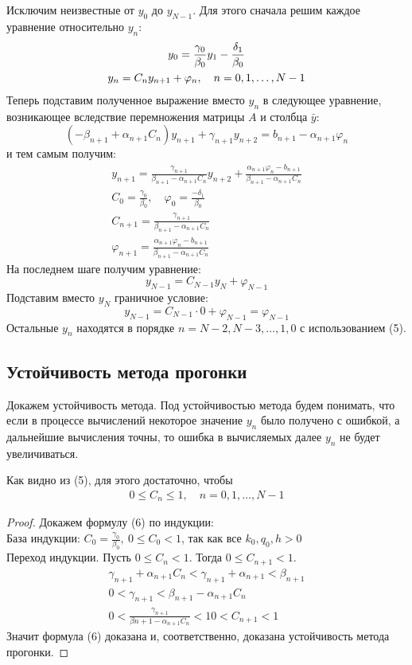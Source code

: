 \documentclass[titlepage]{article}
\def\le{\leqslant}
\begin{document}
Исключим неизвестные от $y_0$ до $y_{N-1}$. Для этого сначала решим каждое уравнение относительно $y_n$:
\begin{gather}
	\notag y_0 = \frac{\gamma_0}{\beta_0}y_1 - \frac{\delta_1}{\beta_0} \\
		   y_n = C_n y_{n+1} + \varphi_n, \quad n = 0,1,\dots,N-1
\end{gather}
Теперь подставим полученное выражение вместо $y_n$ в следующее уравнение, возникающее вследствие перемножения матрицы $A$ и столбца $\bar y$:
$$(-\beta_{n+1} + \alpha_{n+1}C_n)y_{n+1} + \gamma_{n+1}y_{n+2} = b_{n+1} - \alpha_{n+1}\varphi_n$$
и тем самым получим:
\begin{gather*}
	y_{n+1} = \frac{\gamma_{n+1}}{\beta_{n+1} - \alpha_{n+1}C_n}y_{n+2} + \frac{\alpha_{n+1}\varphi_n - b_{n+1}}{\beta_{n+1} - \alpha_{n+1}C_n} \\
	C_0 = \frac{\gamma_0}{\beta_0}, \quad \varphi_0 = \frac{-\delta_1}{\beta_0} \\
	C_{n+1} = \frac{\gamma_{n+1}}{\beta_{n+1}-\alpha_{n+1}C_n} \\
	\varphi_{n+1} = \frac{\alpha_{n+1}\varphi_n - b_{n+1}}{\beta_{n+1} - \alpha_{n+1}C_n}
\end{gather*}
На последнем шаге получим уравнение:
$$y_{N-1} = C_{N-1}y_N + \varphi_{N-1}$$
Подставим вместо $y_N$ граничное условие:
$$y_{N-1} = C_{N-1}\cdot0 + \varphi_{N-1} = \varphi_{N-1}$$
Остальные $y_n$ находятся в порядке $n = N-2, N-3, \dots, 1, 0$ с использованием (5).

\subsection{Устойчивость метода прогонки}
Докажем устойчивость метода. Под устойчивостью метода будем понимать, что если в процессе вычислений некоторое значение $y_n$ было получено с ошибкой, а дальнейшие вычисления точны, то ошибка в вычисляемых далее $y_n$ не будет увеличиваться.

Как видно из (5), для этого достаточно, чтобы
\begin{gather}
	0 \le C_n \le 1, \quad n = 0,1,\dots,N-1
\end{gather}

\begin{proof}
Докажем формулу (6) по индукции:\\
База индукции: $C_0 = \frac{\gamma_0}{\beta_0}, \ 0 \le C_0 < 1$, так как все $k_0, q_0, h > 0$ \\
Переход индукции. Пусть $0 \le C_n < 1$. Тогда $0 \le C_{n+1} < 1$.
\begin{gather*}
	\gamma_{n+1} + \alpha_{n+1}C_n < \gamma_{n+1} + \alpha_{n+1} < \beta_{n+1} \\
	0 < \gamma_{n+1} < \beta_{n+1} - \alpha_{n+1}C_n \\
	0 < \frac{\gamma_{n+1}}{\beta{n+1} - \alpha_{n+1}C_n} < 1
	0 < C_{n+1} < 1
\end{gather*}
Значит формула (6) доказана и, соответственно, доказана устойчивость метода прогонки.	
\end{proof}
\end{document}
